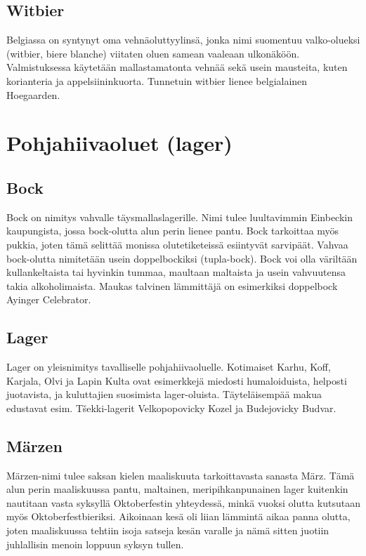 \documentclass[a4paper,11pt]{report}
\begin{document}
\subsection*{Witbier}

Belgiassa on syntynyt oma vehnäoluttyylinsä, jonka nimi suomentuu valko-olueksi (witbier, biere blanche) viitaten oluen samean vaaleaan ulkonäköön. Valmistuksessa käytetään mallastamatonta vehnää sekä usein mausteita, kuten korianteria ja appelsiininkuorta. Tunnetuin witbier lienee belgialainen Hoegaarden.

\section{Pohjahiivaoluet (lager)}

\subsection*{Bock}

Bock on nimitys vahvalle täysmallaslagerille. Nimi tulee luultavimmin Einbeckin kaupungista, jossa bock-olutta alun perin lienee pantu. Bock tarkoittaa myös pukkia, joten tämä selittää monissa olutetiketeissä esiintyvät sarvipäät. Vahvaa bock-olutta nimitetään usein doppelbockiksi (tupla-bock). Bock voi olla väriltään kullankeltaista tai hyvinkin tummaa, maultaan maltaista ja usein vahvuutensa takia alkoholimaista. Maukas talvinen lämmittäjä on esimerkiksi doppelbock Ayinger Celebrator.

\subsection*{Lager}

Lager on yleisnimitys tavalliselle pohjahiivaoluelle. Kotimaiset Karhu, Koff, Karjala, Olvi ja Lapin Kulta ovat esimerkkejä miedosti humaloiduista, helposti juotavista, ja kuluttajien suosimista lager-oluista. Täyteläisempää makua edustavat esim. Tšekki-lagerit Velkopopovicky Kozel ja Budejovicky Budvar.


\subsection*{Märzen}

Märzen-nimi tulee saksan kielen maaliskuuta tarkoittavasta sanasta März. Tämä alun perin maaliskuussa pantu, maltainen, meripihkanpunainen lager kuitenkin nautitaan vasta syksyllä Oktoberfestin yhteydessä, minkä vuoksi olutta kutsutaan myös Oktoberfestbieriksi. Aikoinaan kesä oli liian lämmintä aikaa panna olutta, joten maaliskuussa tehtiin isoja satseja kesän varalle ja nämä sitten juotiin juhlallisin menoin loppuun syksyn tullen.
\end{document}
